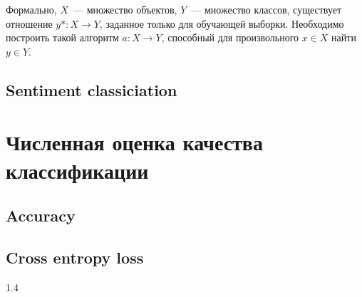 Формально, $X$~--- множество объектов, $Y$~--- множество классов,
существует отношение $y* : X \rightarrow Y$, заданное только для обучающей выборки.
Необходимо построить такой алгоритм $a: X \rightarrow Y$, способный для произвольного
$x \in X$ найти $y \in Y$.

\subsection{Sentiment classiciation}

\section{Численная оценка качества классификации}

\subsection{Accuracy}

\subsection{Cross entropy loss}

1.4 
